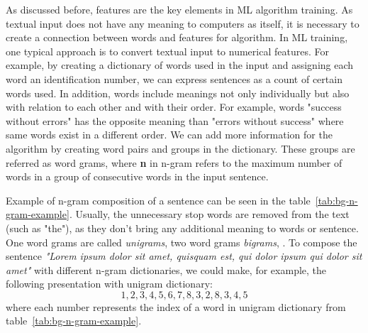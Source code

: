 As discussed before,
features are the key elements in ML algorithm training.
As textual input does not have any meaning to computers as itself,
it is necessary to create a connection between words and features for algorithm.
In ML training,
one typical approach is to convert textual input to numerical features.
For example, by creating a dictionary of words used in the input
and assigning each word an identification number,
we can express sentences as a count of certain words used.
In addition,
words include meanings not only individually but also
with relation to each other and with their order.
For example,
words "success without errors"
has the opposite meaning than "errors without success"
where same words exist in a different order.
We can add more information for the algorithm
by creating word pairs and groups in the dictionary.
These groups are referred as word grams,
where \textbf{n} in n-gram refers to the maximum number of words
in a group of consecutive words in the input sentence.~\cite{furnkranz1998study}

Example of n-gram composition of a sentence can be seen
in the table~\ref{tab:bg-n-gram-example}.
Usually,
the unnecessary stop words are removed from the text
(such as "the"),
as they don't bring any additional meaning to words or sentence.
One word grams are called \textit{unigrams},
two word grams \textit{bigrams}, \etc.
To compose the sentence \textit{"Lorem ipsum dolor sit amet, quisquam est, qui dolor ipsum qui dolor sit amet"}
with different n-gram dictionaries,
we could make, for example,
the following presentation with unigram dictionary:
\begin{equation}
    1,2,3,4,5,6,7,8,3,2,8,3,4,5
\end{equation}
where each number represents the index of a word in unigram dictionary from table~\ref{tab:bg-n-gram-example}.


